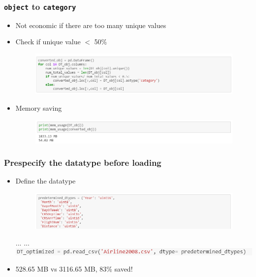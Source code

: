 \documentclass[red]{beamer}
\begin{document}
\begin{frame}
\frametitle{\texttt{object} to \texttt{category}}
\begin{itemize}
	\item Not economic if there are too many unique values
	\vspace{2mm}
	\item Check if unique value $<$ 50\%
	\begin{figure}
		\centering
		\includegraphics[width=1\linewidth]{figure/screenshot018}
	\end{figure}
	\item Memory saving
	\begin{figure}
		\centering
		\includegraphics[width=1\linewidth]{figure/screenshot019}
	\end{figure}
\end{itemize}

\end{frame}

\begin{frame}
\frametitle{Prespecify the datatype before loading}
\begin{itemize}
	\item Define the datatype
	\begin{figure}
		\centering
		\includegraphics[width=1\linewidth]{figure/screenshot021}
	\end{figure}
	\vspace{-2mm}
	... ...
	\vspace{3mm}
	\includegraphics[width=1\linewidth]{figure/screenshot022}
	\vspace{3mm}
	\item 528.65 MB vs 3116.65 MB, 83\% saved!
\end{itemize}
\end{frame}
\end{document}
